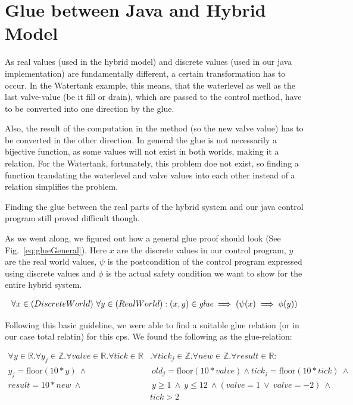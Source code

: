 \section{Glue between Java and Hybrid Model}
\label{sec:Watertank:Glue}

As real values (used in the hybrid model) and discrete values (used in our java implementation) are fundamentally different, a certain transformation has to occur.  In the Watertank example, this means, that the waterlevel as well as the last valve-value (be it fill or drain), which are passed to the control method, have to be converted into one direction by the glue. 

Also, the result of the computation in the method (so the new valve value) has to be converted in the other direction. In general the glue is not necessarily a bijective function, as some values will not exist in both worlds, making it a relation. For the Watertank, fortunately, this problem doe not exist, so finding a function translating the waterlevel and valve values into each other instead of a relation simplifies the problem.

Finding the glue between the real parts of the hybrid system and our java control program still proved difficult though.

As we went along, we figured out how a general glue proof should look (See Fig.~\ref{eq:glueGeneral}). Here \(x\) are the discrete values in our control program, \(y\) are the real world values, \(\psi\) is the postcondition of the control program expressed using discrete values and \(\phi\) is the actual safety condition we want to show for the entire hybrid system.

\begin{equation}
	\centering
	\begin{split}
		\forall x \in (Discrete World)~\forall y \in (Real World):(x,y) \in \textit{glue} \implies (\psi(x) \implies \phi(y))
	\end{split}
	\label{eq:glueGeneral}
\end{equation}

Following this basic guideline, we were able to find a suitable glue relation (or in our case total relatin) for this cps. We found the following as the glue-relation:

\begin{equation}
	\begin{split}
		\forall y \in \mathbb{R} . \forall y_j \in \mathbb{Z}. \forall valve \in \mathbb{R}. \forall tick \in \mathbb{R}&. \forall tick_j \in \mathbb{Z} . \forall new \in \mathbb{Z}. \forall result \in \mathbb{R} : \\  y_j = \textrm{floor}(10 * y)~\wedge&~ old_j = \textrm{floor}(10*valve) \wedge tick_j = \textrm{floor}(10*tick)~\wedge \\ result = 10 * new~\wedge&~ y \geq 1~\wedge~y \leq 12~\wedge  (valve = 1 ~\vee~valve = -2)~\wedge \\&tick > 2 
	\end{split}
	\label{eq:glueWatertank}
\end{equation}

